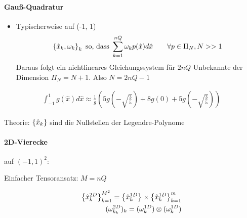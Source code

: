 \paragraph{Gauß-Quadratur}
\begin{itemize}
\item Typischerweise auf (-1, 1)
  \begin{align*}
    \left\{ \hat x_{k}, \omega_{k} \right\}_{k} \text{ so, dass } \sum_{k = 1}^{nQ} \omega_{k} p(\hat x) d \hat x \qquad \forall p \in \Pi_{N}, N >> 1
  \end{align*}
Daraus folgt ein nichtlineares Gleichungssystem für $2 nQ$ Unbekannte der Dimension $\Pi_{N} = N+1$. Also $N = 2nQ-1$ 
\end{itemize}
\begin{beispiel}
  \begin{align*}
    \int_{-1}^{1} g(\hat x) d \hat x \approx \frac {1}{g}(5g(- \sqrt{\frac 3 5}) + 8g(0) + 5g(- \sqrt{\frac 3 5}))
  \end{align*}
\end{beispiel}
Theorie: $\left\{ \hat x_{k} \right\}$ sind die Nullstellen der Legendre-Polynome

\paragraph{2D-Vierecke} auf $(-1, 1)^{2}$: 

Einfacher Tensoransatz: $M= nQ$

\begin{align*}
  \left\{ \hat x_{k}^{2D} \right\}_{k= 1}^{M^{2}} = \left\{ \hat x_{k}^{1D} \right\} \times\left\{ \hat x_{k}^{1D} \right\}_{k = 1}^{m}\\
(\omega_{k_{k}}^{2D})_{k} = (\omega_{k}^{1D}) \otimes (\omega_{k}^{1D})
\end{align*}

